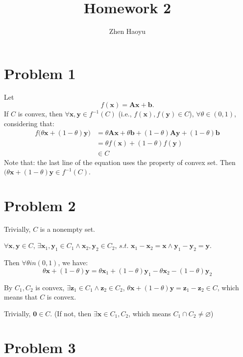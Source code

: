 \documentclass{article}
\def\bb{\boldsymbol{b}}
\def\bx{\boldsymbol{x}}
\def\by{\boldsymbol{y}}
\def\bz{\boldsymbol{z}}
\def\bA{\boldsymbol{A}}
\begin{document}
\title{Homework 2}
\author{Zhen Haoyu}
\maketitle


\section*{Problem 1}

Let
$$
f(\bx)=\bA\bx+\bb.
$$
If $C$ is convex, then $\forall \bx,\by\in f^{-1}(C)$ (i.e., $f(\bx),f(\by)\in C$), $\forall \theta \in (0,1)$, considering that:
$$
\begin{aligned}
	f\big(\theta \bx+(1-\theta)\by\big)
	&=\theta \bA\bx+\theta \bb+(1-\theta)\bA\by+(1-\theta)\bb
	\\
	&=\theta f(\bx)+(1-\theta)f(\by)
	\\
	&\in C
\end{aligned}
$$
Note that: the last line of the equation uses the property of convex set. Then $(\theta \bx+(1-\theta)\by\in f^{-1}(C)$.

\section*{Problem 2}

Trivially, $C$ is a nonempty set.

$\forall \bx,\by \in C$, $\exists \bx_1,\by_1\in C_1 \land \bx_2,\by_2\in C_2$, $s.t.$ $\bx_1-\bx_2=\bx \land \by_1-\by_2=\by$.

Then $\forall\theta in (0,1)$, we have:
$$
\theta \bx +(1-\theta)\by=\theta\bx_1+(1-\theta)\by_1-\theta\bx_2-(1-\theta)\by_2
$$

By $C_1,C_2$ is convex, $\exists \bz_1\in C_1 \land \bz_2\in C_2$, $\theta \bx +(1-\theta)\by=\bz_1-\bz_2\in C$, which means that $C$ is convex.

Trivially, $\boldsymbol{0}\in C$. (If not, then $\exists \bx \in C_1,C_2$, which means $C_1\cap C_2\neq\varnothing$)

\section*{Problem 3}
\end{document}
